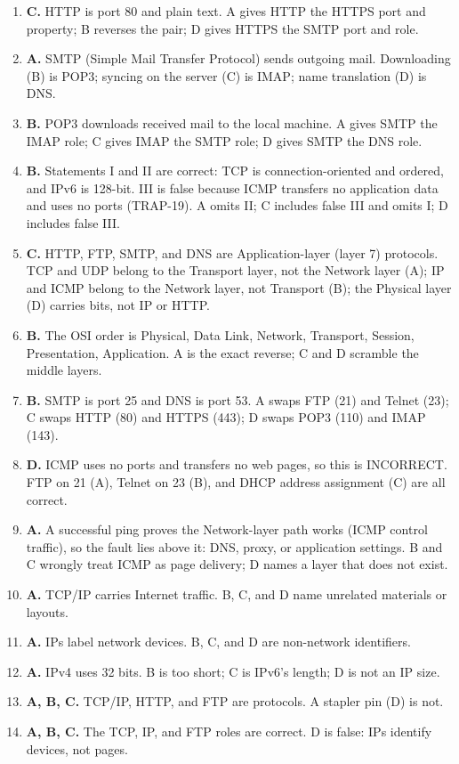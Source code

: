 \documentclass[11pt]{article}
\begin{document}
\begin{enumerate}[label=\textbf{Q\arabic*.}, leftmargin=*]
  DNS server is DHCP. DNS (A) resolves names; ICMP (C) diagnoses; FTP (D)
  moves files.
\item \textbf{C.} HTTP is port 80 and plain text. A gives HTTP the HTTPS
  port and property; B reverses the pair; D gives HTTPS the SMTP port and
  role.
\item \textbf{A.} SMTP (Simple Mail Transfer Protocol) sends outgoing mail.
  Downloading (B) is POP3; syncing on the server (C) is IMAP; name
  translation (D) is DNS.
\item \textbf{B.} POP3 downloads received mail to the local machine. A gives
  SMTP the IMAP role; C gives IMAP the SMTP role; D gives SMTP the DNS role.
\item \textbf{B.} Statements I and II are correct: TCP is connection-oriented
  and ordered, and IPv6 is 128-bit. III is false because ICMP transfers no
  application data and uses no ports (TRAP-19). A omits II; C includes false
  III and omits I; D includes false III.
\item \textbf{C.} HTTP, FTP, SMTP, and DNS are Application-layer (layer 7)
  protocols. TCP and UDP belong to the Transport layer, not the Network
  layer (A); IP and ICMP belong to the Network layer, not Transport (B); the
  Physical layer (D) carries bits, not IP or HTTP.
\item \textbf{B.} The OSI order is Physical, Data Link, Network, Transport,
  Session, Presentation, Application. A is the exact reverse; C and D
  scramble the middle layers.
\item \textbf{B.} SMTP is port 25 and DNS is port 53. A swaps FTP (21) and
  Telnet (23); C swaps HTTP (80) and HTTPS (443); D swaps POP3 (110) and
  IMAP (143).
\item \textbf{D.} ICMP uses no ports and transfers no web pages, so this is
  INCORRECT. FTP on 21 (A), Telnet on 23 (B), and DHCP address assignment
  (C) are all correct.
\item \textbf{A.} A successful ping proves the Network-layer path works
  (ICMP control traffic), so the fault lies above it: DNS, proxy, or
  application settings. B and C wrongly treat ICMP as page delivery; D names
  a layer that does not exist.

\item \textbf{A.} TCP/IP carries Internet traffic. B, C, and D name unrelated materials or layouts.
\item \textbf{A.} IPs label network devices. B, C, and D are non-network identifiers.
\item \textbf{A.} IPv4 uses 32 bits. B is too short; C is IPv6's length; D is not an IP size.
\item \textbf{A, B, C.} TCP/IP, HTTP, and FTP are protocols. A stapler pin (D) is not.
\item \textbf{A, B, C.} The TCP, IP, and FTP roles are correct. D is false: IPs identify devices, not pages.
\end{enumerate}
\def\JKSSBLessonID{41}\def\JKSSBAnswers{1}
\end{document}
